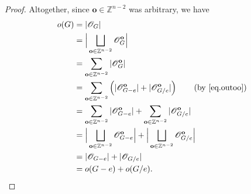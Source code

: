 \documentclass[12pt]{article}
\theoremstyle{definition}
\theoremstyle{remark}
\newcommand{\oo}{\mathbf{o}}
\newcommand{\tup}[1]{\left( #1 \right)}
\newcommand{\out}{\mathscr{O}}
\begin{document}
\begin{proof}
    \bigskip
    Altogether, since $\oo \in \mathbb{Z}^{n-2}$ was arbitrary, we have \begin{align*}
        o(G) &= |\out_G| \\
        &= \Big|\bigsqcup_{\textbf{o} \in \mathbb{Z}^{n-2}}\out_G^\textbf{o}\Big| \\
        &= \sum_{\textbf{o} \in \mathbb{Z}^{n-2}}|\out_G^\textbf{o}| \\
        &= \sum_{\textbf{o} \in \mathbb{Z}^{n-2}}\tup{|\out_{G-e}^\textbf{o}|+|\out_{G/e}^\textbf{o}|}  \qquad \tup{\text{by \eqref{eq.outoo}}} \\
        &= \sum_{\textbf{o} \in \mathbb{Z}^{n-2}}|\out_{G-e}^\textbf{o}|+\sum_{\textbf{o} \in \mathbb{Z}^{n-2}}|\out_{G/e}^\textbf{o}| \\
        &= \Big|\bigsqcup_{\textbf{o} \in \mathbb{Z}^{n-2}}\out_{G-e}^\textbf{o}\Big| + \Big|\bigsqcup_{\textbf{o} \in \mathbb{Z}^{n-2}}\out_{G/e}^\textbf{o}\Big| \\
        &= |\out_{G-e}|+|\out_{G/e}| \\
        &= o(G-e)+o(G/e).
    \end{align*}

\end{proof}
\end{document}

